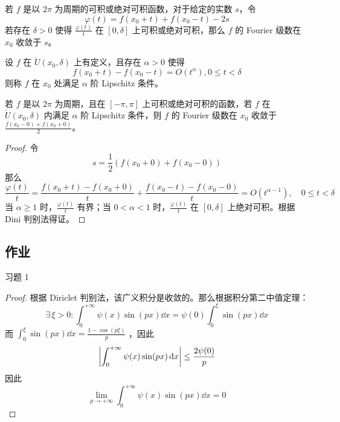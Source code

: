 \begin{theorem}
    若 $f$ 是以 $2\pi$ 为周期的可积或绝对可积函数，对于给定的实数 $s$，令
    $$
    \varphi(t) = f(x_0 + t) + f(x_0 - t) - 2s
    $$
    若存在 $\delta > 0$ 使得 $\frac{\varphi(t)}{t}$ 在 $[0, \delta]$ 上可积或绝对可积，那么 $f$ 的 Fourier 级数在 $x_0$ 收敛于 $s$。
\end{theorem}

\begin{definition}[Lipschitz 条件]
    设 $f$ 在 $\mathring{U}(x_0, \delta)$ 上有定义，且存在 $\alpha > 0$ 使得
    $$
    f(x_0 + t) - f(x_0 - t) = O(t^{\alpha}), 0 \le t < \delta
    $$
    则称 $f$ 在 $x_0$ 处满足 $\alpha$ 阶 Lipschitz 条件。
\end{definition}

\begin{theorem}
    若 $f$ 是以 $2\pi$ 为周期，且在 $[-\pi, \pi]$ 上可积或绝对可积的函数，若 $f$ 在 $\mathring{U}(x_0, \delta)$ 内满足 $\alpha$ 阶 Lipschitz 条件，则 $f$ 的 Fourier 级数在 $x_0$ 收敛于 $\frac{f(x_0 - 0) + f(x_0 + 0)}{2}$。

    \begin{proof}
        令
        $$
        s = \frac{1}{2} (f(x_0 + 0) + f(x_0 - 0))
        $$
        那么
        $$
        \frac{\varphi(t)}{t} = \frac{f(x_0 + t) - f(x_0 + 0)}{t} + \frac{f(x_0 - t) - f(x_0 - 0)}{t} = O(t^{\alpha - 1}),\quad 0 \le t < \delta
        $$
        当 $\alpha \ge 1$ 时，$\frac{\varphi(t)}{t}$ 有界；当 $0 < \alpha < 1$ 时，$\frac{\varphi(t)}{t}$ 在 $[0, \delta]$ 上绝对可积。根据 Dini 判别法得证。
    \end{proof}
\end{theorem}

\subsection{作业}

\begin{problem}
    习题 1
    \begin{proof}
        根据 Diriclet 判别法，该广义积分是收敛的。那么根据积分第二中值定理：
        $$
        \exists\,\xi > 0: \int_0^{+\infty} \psi(x) \sin (p x) \dd{x} = \psi(0) \int_0^{\xi} \sin (p x) \dd{x}
        $$
        而 $\int_0^{\xi} \sin (p x) \dd{x} = \frac{1 - \cos (p \xi)}{p}$ ，因此
        $$
        \abs{\int_0^{+ \infty} \psi(x) \sin (p x) \dd{x}} \le \frac{2 \psi(0)}{p}
        $$
        因此
        $$
        \lim_{p \to +\infty} \int_0^{+ \infty} \psi(x) \sin (p x) \dd{x} = 0
        $$
    \end{proof}
\end{problem}

